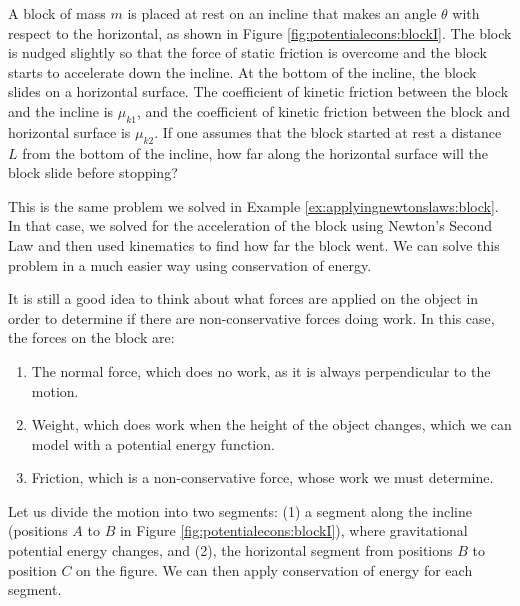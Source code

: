 \begin{example}{\label{ex:potentialecons:blockI}
A block of mass $m$ is placed at rest on an incline that makes an angle $\theta$ with respect to the horizontal, as shown in Figure \ref{fig:potentialecons:blockI}. The block is nudged slightly so that the force of static friction is overcome and the block starts to accelerate down the incline. At the bottom of the incline, the block slides on a horizontal surface. 
The coefficient of kinetic friction between the block and the incline is $\mu_{k1}$, and the coefficient of kinetic friction between the block and horizontal surface is $\mu_{k2}$. If one assumes that the block started at rest a distance $L$ from the bottom of the incline, how far along the horizontal surface will the block slide before stopping?}

This is the same problem we solved in Example \ref{ex:applyingnewtonslaws:block}. In that case, we solved for the acceleration of the block using Newton's Second Law and then used kinematics to find how far the block went. We can solve this problem in a much easier way using conservation of energy. 

It is still a good idea to think about what forces are applied on the object in order to determine if there are non-conservative forces doing work. In this case, the forces on the block are:
\begin{enumerate}
\item The normal force, which does no work, as it is always perpendicular to the motion.
\item Weight, which does work when the height of the object changes, which we can model with a potential energy function.
\item Friction, which is a non-conservative force, whose work we must determine. 
\end{enumerate}
Let us divide the motion into two segments: (1) a segment along the incline (positions $A$ to $B$ in Figure \ref{fig:potentialecons:blockI}), where gravitational potential energy changes, and (2), the horizontal segment from positions $B$ to position $C$ on the figure. We can then apply conservation of energy for each segment. 


\end{example}

